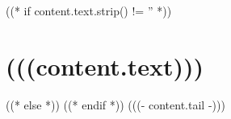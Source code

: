 ((* if content.text.strip() != '' *))
\section{(((content.text)))}
((* else *))
((* endif *))
 (((- content.tail -)))

